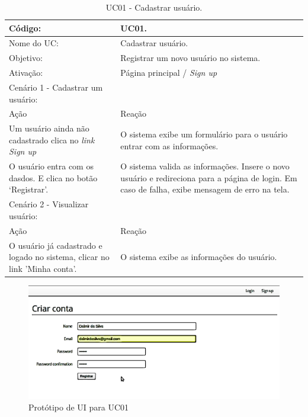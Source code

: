 \documentclass[11pt]{article}
\begin{document}
        \begin{table}[h]
          \begin{center}
            \begin{tabular}{ | p{7cm} | p{8cm} | }
              \hline
              Código: \cellcolor{gray} & UC01. \\
              \hline
              Nome do UC: \cellcolor{gray} & Cadastrar usuário. \\
              \hline
              Objetivo: \cellcolor{gray} & Registrar um novo usuário no sistema. \\
              \hline
              Ativação: \cellcolor{gray} & Página principal / \em Sign up \\
              \hline
              \hline
              Cenário 1 - Cadastrar um usuário: &  \\
              \hline
              Ação\cellcolor{gray} & Reação\cellcolor{gray} \\
              \hline
              Um usuário ainda não cadastrado clica no \em link Sign up & O sistema exibe um formulário para o usuário entrar com as informações. \\
              \hline
              O usuário entra com os dasdos. E clica no botão ‘Registrar’. & O sistema valida as informações. Insere o novo usuário e redireciona para a página de login. Em caso de falha, exibe mensagem de erro na tela. \\
              \hline
              \hline
              Cenário 2 - Visualizar usuário: &  \\
              \hline
              Ação\cellcolor{gray} & Reação\cellcolor{gray} \\
              \hline
              O usuário já cadastrado e logado no sistema, clicar no link 'Minha conta'. & O sistema exibe as informações do usuário. \\
              \hline
            \end{tabular}
            \caption{UC01 - Cadastrar usuário.}
          \end{center}
        \end{table}
    
        \begin{figure}[h!]
          \centering
          \includegraphics[width=.9\textwidth]{create_user.png}
          \caption{Protótipo de UI para UC01}
        \end{figure}
\end{document}
